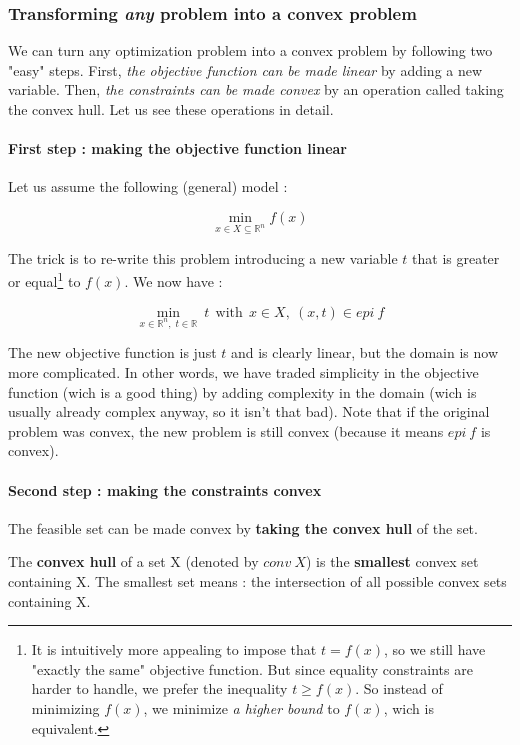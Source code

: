 \documentclass[a4paper]{article}
\begin{document}
\subsubsection{Transforming \textit{any} problem into a convex problem}
We can turn any optimization problem into a convex problem by following two "easy" steps. First, \textit{the objective function can be made linear} by adding a new variable. Then, \textit{the constraints can be made convex} by an operation called taking the convex hull. Let us see these operations in detail. \\

\paragraph{First step : making the objective function linear}
Let us assume the following (general) model :

$$\min_{x \in X \subseteq \mathbb{R}^n} f(x)$$

The trick is to re-write this problem introducing a new variable $t$ that is greater or equal\footnote{It is intuitively more appealing to impose that $t = f(x)$, so we still have "exactly the same" objective function. But since equality constraints are harder to handle, we prefer the inequality $t \geq f(x)$. So instead of minimizing $f(x)$, we minimize \textit{a higher bound} to $f(x)$, wich is equivalent.} to $f(x)$.  We now have :

$$\min_{x \in \mathbb{R}^n, \; t \in \mathbb{R}} \: t \: \: \mathrm{with} \: \: x \in X, \: (x,t) \in epi \: f$$

The new objective function is just $t$ and is clearly linear, but the domain is now more complicated. In other words, we have traded simplicity in the objective function (wich is a good thing) by adding complexity in the domain (wich is usually already complex anyway, so it isn't that bad). Note that if the original problem was convex, the new problem is still convex (because it means $epi \: f$ is convex).

\paragraph{Second step : making the constraints convex}
The feasible set can be made convex by \textbf{taking the convex hull} of the set.

\begin{def1}
The \textbf{convex hull} of a set X (denoted by $conv \: X$) is the \textbf{smallest} convex set containing X. The smallest set means : the intersection of all possible convex sets containing X.
\end{def1}
\end{document}

